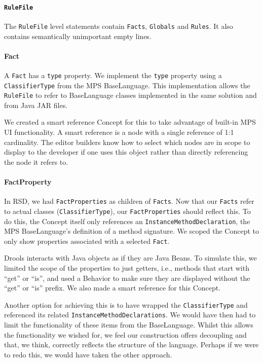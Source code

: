 \paragraph{\texttt{RuleFile}} The \texttt{RuleFile} level statements contain \texttt{Facts}, \texttt{Globals} and \texttt{Rules}.
It also contains semantically unimportant empty lines.

\paragraph{Fact} A \texttt{Fact} has a \texttt{type} property.
We implement the \texttt{type} property using a \texttt{ClassifierType} from the MPS BaseLanguage.
This implementation allows the \texttt{RuleFile} to refer to BaseLanguage classes implemented in the same solution and from Java JAR files.

We created a smart reference Concept for this to take advantage of built-in MPS UI functionality.
A smart reference is a node with a single reference of 1:1 cardinality.
The editor builders know how to select which nodes are in scope to display to the developer if one uses this object rather than directly referencing the node it refers to.

\paragraph{FactProperty} In RSD, we had \texttt{FactProperties} as children of \texttt{Facts}.
Now that our \texttt{Facts} refer to actual classes (\texttt{ClassifierType}), our \texttt{FactProperties} should reflect this.
To do this, the Concept itself only references an \linebreak\texttt{InstanceMethodDeclaration}, the MPS BaseLanguage's definition of a method signature.
We scoped the Concept to only show properties associated with a selected \texttt{Fact}.

Drools interacts with Java objects as if they are Java Beans.
To simulate this, we limited the scope of the properties to just getters, i.e., methods that start with ``get'' or ``is'', and used a Behavior to make sure they are displayed without the ``get'' or ``is'' prefix.
We also made a smart reference for this Concept.

Another option for achieving this is to have wrapped the \texttt{ClassifierType} and referenced its related \linebreak\texttt{InstanceMethodDeclarations}.
We would have then had to limit the functionality of these items from the BaseLanguage.
Whilst this allows the functionality we wished for, we feel our construction offers decoupling and that, we think, correctly reflects the structure of the language.
Perhaps if we were to redo this, we would have taken the other approach.


